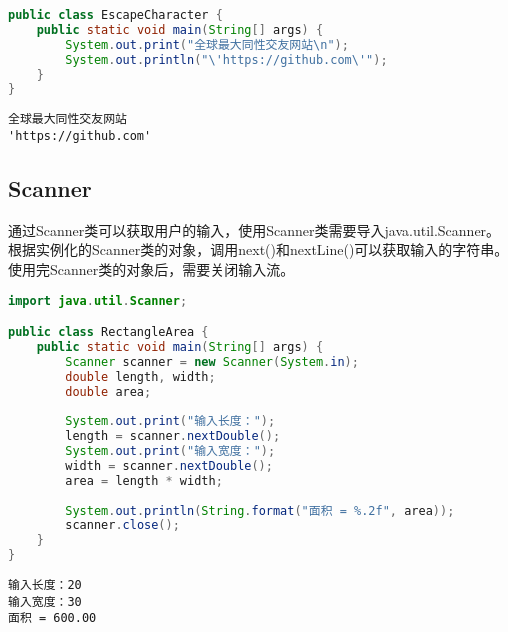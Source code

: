 
\begin{lstlisting}[language=Java]
public class EscapeCharacter {
	public static void main(String[] args) {
		System.out.print("全球最大同性交友网站\n");
		System.out.println("\'https://github.com\'");
	}
}
\end{lstlisting}

\begin{tcolorbox}
	\begin{verbatim}
全球最大同性交友网站
'https://github.com'
	\end{verbatim}
\end{tcolorbox}

\vspace{0.5cm}

\subsection{Scanner}

通过Scanner类可以获取用户的输入，使用Scanner类需要导入java.util.Scanner。根据实例化的Scanner类的对象，调用next()和nextLine()可以获取输入的字符串。\\

使用完Scanner类的对象后，需要关闭输入流。\\


\begin{lstlisting}[language=Java]
import java.util.Scanner;

public class RectangleArea {
	public static void main(String[] args) {
		Scanner scanner = new Scanner(System.in);
		double length, width;
		double area;
		
		System.out.print("输入长度：");
		length = scanner.nextDouble();
		System.out.print("输入宽度：");
		width = scanner.nextDouble();
		area = length * width;
		
		System.out.println(String.format("面积 = %.2f", area));
		scanner.close();
	}
}
\end{lstlisting}

\begin{tcolorbox}
	\begin{verbatim}
输入长度：20
输入宽度：30
面积 = 600.00
	\end{verbatim}
\end{tcolorbox}

\vspace{0.5cm}

